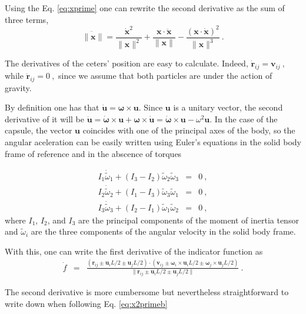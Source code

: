 \documentclass[aps,pre,onecolumn,preprint,showpacs]{revtex4}
\begin{document}
Using the Eq. \eqref{eq:xprime} one can rewrite the second derivative as the sum of three terms,
\begin{equation}
  \label{eq:x2primeb}
  \ddot{\|\mathbf{x}\|}  =  \frac{\dot{\mathbf{x}}^2 }{\|\mathbf{x}\|^2} +  \frac{  \mathbf{x}\cdotp\ddot{\mathbf{x}} }{\|\mathbf{x}\|} - \frac{(\mathbf{x}\cdotp\dot{\mathbf{x}})^2 }{\|\mathbf{x}\|^3} ~.
\end{equation}

The derivatives of the ceters' position are easy to calculate. Indeed,
$\dot{\mathbf{r}}_{ij} = \mathbf{v}_{ij}~,$ while
$\ddot{\mathbf{r}}_{ij} = 0~,$ since we assume that both particles
are under the action of gravity.

By definition one has that $\dot{\mathbf{u}} =
\mathbf{\omega}\times\mathbf{u}.$ Since $\mathbf{u}$ is a unitary vector, the
second derivative of it will be $\ddot{\mathbf{u}} =
\dot{\mathbf{\omega}}\times\mathbf{u} + \mathbf{\omega}\times\dot{\mathbf{u}} = 
\dot{\mathbf{\omega}}\times\mathbf{u} - \omega^2\mathbf{u}.$ In the case of the capsule, the
vector $\mathbf{u}$ coincides with one of the principal axes of the body,
so the angular aceleration can be easily written using Euler's
equations in the solid body frame of reference and in the abscence of 
torques

\begin{eqnarray}
I_1\dot{\tilde{\omega}}_{1}+(I_3-I_2)\tilde{\omega}_2\tilde{\omega}_3 &=& 0~,\nonumber\\
I_2\dot{\tilde{\omega}}_{2}+(I_1-I_3)\tilde{\omega}_3\tilde{\omega}_1 &=& 0~,\\
I_3\dot{\tilde{\omega}}_{3}+(I_2-I_1)\tilde{\omega}_1\tilde{\omega}_2 &=& 0~,\nonumber
\end{eqnarray}
where $I_1$, $I_2$, and $I_3$ are the principal components of the
moment of inertia tensor and $\tilde{\omega}_i$ are the three
components of the angular velocity in the solid body frame.

With this, one can write the first derivative of the indicator function as 
\begin{eqnarray}
\dot{f} &=&
\frac{(\mathbf{r}_{ij} \pm \mathbf{u}_{i}L/2 \pm \mathbf{u}_{j}L/2)\cdotp(\mathbf{v}_{ij} \pm \mathbf{\omega}_i\times\mathbf{u}_{i}L/2 \pm \mathbf{\omega}_j\times\mathbf{u}_{j}L/2)}{\|\mathbf{r}_{ij} \pm \mathbf{u}_{i}L/2 \pm \mathbf{u}_{j}L/2\|}~.
\end{eqnarray}

The second derivative is more cumbersome but nevertheless straightforward to write down when following Eq. \eqref{eq:x2primeb}
\end{document}
